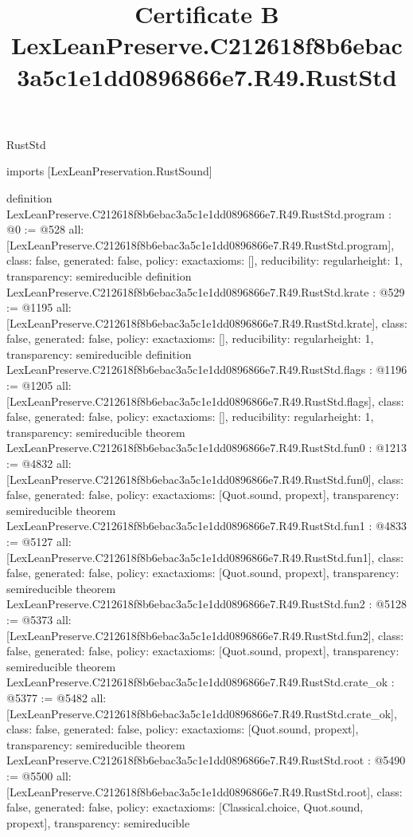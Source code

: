 \begin{lexlean}{RustStd}
\title{Certificate B LexLeanPreserve.C212618f8b6ebac3a5c1e1dd0896866e7.R49.RustStd}
\begin{coremodule}
imports [LexLeanPreservation.RustSound]

definition LexLeanPreserve.C212618f8b6ebac3a5c1e1dd0896866e7.R49.RustStd.program : @0 := @528 {
  all: [LexLeanPreserve.C212618f8b6ebac3a5c1e1dd0896866e7.R49.RustStd.program],
  class: false,
  generated: false,
  policy: exact{axioms: []},
  reducibility: regular{height: 1},
  transparency: semireducible
}
definition LexLeanPreserve.C212618f8b6ebac3a5c1e1dd0896866e7.R49.RustStd.krate : @529 := @1195 {
  all: [LexLeanPreserve.C212618f8b6ebac3a5c1e1dd0896866e7.R49.RustStd.krate],
  class: false,
  generated: false,
  policy: exact{axioms: []},
  reducibility: regular{height: 1},
  transparency: semireducible
}
definition LexLeanPreserve.C212618f8b6ebac3a5c1e1dd0896866e7.R49.RustStd.flags : @1196 := @1205 {
  all: [LexLeanPreserve.C212618f8b6ebac3a5c1e1dd0896866e7.R49.RustStd.flags],
  class: false,
  generated: false,
  policy: exact{axioms: []},
  reducibility: regular{height: 1},
  transparency: semireducible
}
theorem LexLeanPreserve.C212618f8b6ebac3a5c1e1dd0896866e7.R49.RustStd.fun0 : @1213 := @4832 {
  all: [LexLeanPreserve.C212618f8b6ebac3a5c1e1dd0896866e7.R49.RustStd.fun0],
  class: false,
  generated: false,
  policy: exact{axioms: [Quot.sound, propext]},
  transparency: semireducible
}
theorem LexLeanPreserve.C212618f8b6ebac3a5c1e1dd0896866e7.R49.RustStd.fun1 : @4833 := @5127 {
  all: [LexLeanPreserve.C212618f8b6ebac3a5c1e1dd0896866e7.R49.RustStd.fun1],
  class: false,
  generated: false,
  policy: exact{axioms: [Quot.sound, propext]},
  transparency: semireducible
}
theorem LexLeanPreserve.C212618f8b6ebac3a5c1e1dd0896866e7.R49.RustStd.fun2 : @5128 := @5373 {
  all: [LexLeanPreserve.C212618f8b6ebac3a5c1e1dd0896866e7.R49.RustStd.fun2],
  class: false,
  generated: false,
  policy: exact{axioms: [Quot.sound, propext]},
  transparency: semireducible
}
theorem LexLeanPreserve.C212618f8b6ebac3a5c1e1dd0896866e7.R49.RustStd.crate_ok : @5377 := @5482 {
  all: [LexLeanPreserve.C212618f8b6ebac3a5c1e1dd0896866e7.R49.RustStd.crate_ok],
  class: false,
  generated: false,
  policy: exact{axioms: [Quot.sound, propext]},
  transparency: semireducible
}
theorem LexLeanPreserve.C212618f8b6ebac3a5c1e1dd0896866e7.R49.RustStd.root : @5490 := @5500 {
  all: [LexLeanPreserve.C212618f8b6ebac3a5c1e1dd0896866e7.R49.RustStd.root],
  class: false,
  generated: false,
  policy: exact{axioms: [Classical.choice, Quot.sound, propext]},
  transparency: semireducible
}


\end{coremodule}
\end{lexlean}
